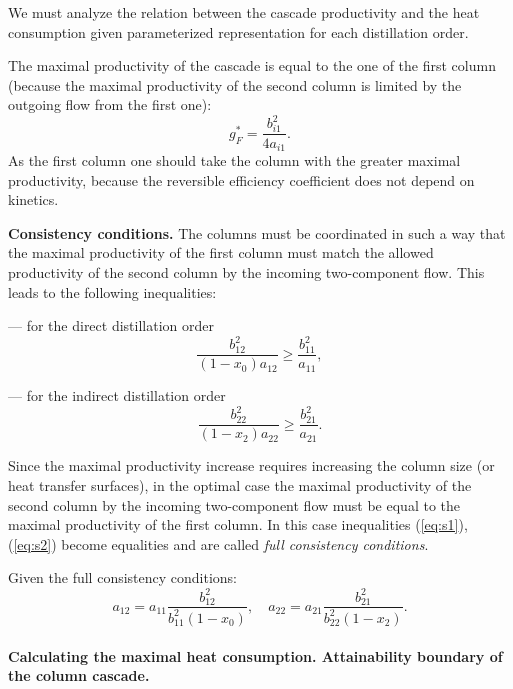 \documentclass[12pt]{article}
\begin{document}
We must analyze the relation between the cascade productivity and the heat consumption given parameterized representation for each distillation order.

The maximal productivity of the cascade is equal to the one of the first column (because the maximal productivity of the second column is limited by the outgoing flow from the first one): 
\begin{equation}
g_F^* = \frac{b_{i1}^2}{4a_{i1}}.
\label{eq:max-perf}
\end{equation}
As the first column one should take the column with the greater maximal productivity, because the reversible efficiency coefficient does not depend on kinetics.

\textbf {Consistency conditions.}
The columns must be coordinated in such a way that the maximal productivity of the first column must match the allowed productivity of the second column by the incoming two-component flow. This leads to the following inequalities:

--- for the direct distillation order
\begin{equation}
\frac{b_{12}^2}{(1-x_0)a_{12}} \geq \frac{b_{11}^2}{a_{11}},
\label{eq:s1}
\end{equation}


--- for the indirect distillation order
\begin{equation}
\frac{b_{22}^2}{(1-x_2)a_{22}} \geq \frac{b_{21}^2}{a_{21}}.
\label{eq:s2}
\end{equation}

Since the maximal productivity increase requires increasing the column size (or heat transfer surfaces), in the optimal case the maximal productivity of the second column by the incoming two-component flow must be equal to the maximal productivity of the first column. In this case inequalities (\ref{eq:s1}), (\ref{eq:s2}) become equalities and are called \textit{full consistency conditions}.

Given the full consistency conditions:
\begin{equation}
a_{12} = a_{11}\frac{b_{12}^2}{b_{11}^2(1-x_0)},\quad a_{22} = a_{21}\frac{b_{21}^2}{b_{22}^2(1-x_2)}.
\label{eq:s3}
\end{equation}

\paragraph{Calculating the maximal heat consumption. Attainability boundary of the column cascade.}
\end{document}
